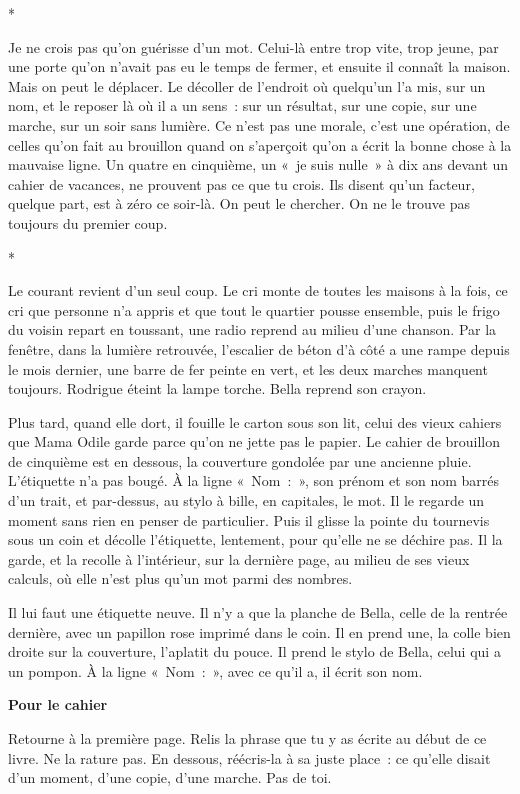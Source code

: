 \documentclass[10.5pt,twoside,openright]{book}
\newcommand{\asterisme}{\par\vspace{0.7em}\centerline{\color{gris}*\quad*\quad*}\vspace{0.7em}\par\noindent}
\newenvironment{pourcahier}[1]{\par\vspace{0.9em}\begin{tcolorbox}[colback=black!4,colframe=accent,boxrule=0pt,leftrule=2.2pt,arc=0pt,left=8pt,right=8pt,top=5pt,bottom=5pt]\small\textbf{#1}\par\smallskip}{\end{tcolorbox}\par}
\begin{document}
\asterisme

Je ne crois pas qu’on guérisse d’un mot. Celui-là entre trop vite, trop jeune, par une porte qu’on n’avait pas eu le temps de fermer, et ensuite il connaît la maison. Mais on peut le déplacer. Le décoller de l’endroit où quelqu’un l’a mis, sur un nom, et le reposer là où il a un sens : sur un résultat, sur une copie, sur une marche, sur un soir sans lumière. Ce n’est pas une morale, c’est une opération, de celles qu’on fait au brouillon quand on s’aperçoit qu’on a écrit la bonne chose à la mauvaise ligne. Un quatre en cinquième, un « je suis nulle » à dix ans devant un cahier de vacances, ne prouvent pas ce que tu crois. Ils disent qu’un facteur, quelque part, est à zéro ce soir-là. On peut le chercher. On ne le trouve pas toujours du premier coup.

\asterisme

Le courant revient d’un seul coup. Le cri monte de toutes les maisons à la fois, ce cri que personne n’a appris et que tout le quartier pousse ensemble, puis le frigo du voisin repart en toussant, une radio reprend au milieu d’une chanson. Par la fenêtre, dans la lumière retrouvée, l’escalier de béton d’à côté a une rampe depuis le mois dernier, une barre de fer peinte en vert, et les deux marches manquent toujours. Rodrigue éteint la lampe torche. Bella reprend son crayon.

Plus tard, quand elle dort, il fouille le carton sous son lit, celui des vieux cahiers que Mama Odile garde parce qu’on ne jette pas le papier. Le cahier de brouillon de cinquième est en dessous, la couverture gondolée par une ancienne pluie. L’étiquette n’a pas bougé. À la ligne « Nom : », son prénom et son nom barrés d’un trait, et par-dessus, au stylo à bille, en capitales, le mot. Il le regarde un moment sans rien en penser de particulier. Puis il glisse la pointe du tournevis sous un coin et décolle l’étiquette, lentement, pour qu’elle ne se déchire pas. Il la garde, et la recolle à l’intérieur, sur la dernière page, au milieu de ses vieux calculs, où elle n’est plus qu’un mot parmi des nombres.

Il lui faut une étiquette neuve. Il n’y a que la planche de Bella, celle de la rentrée dernière, avec un papillon rose imprimé dans le coin. Il en prend une, la colle bien droite sur la couverture, l’aplatit du pouce. Il prend le stylo de Bella, celui qui a un pompon. À la ligne « Nom : », avec ce qu’il a, il écrit son nom.

\begin{pourcahier}{Pour le cahier}
Retourne à la première page. Relis la phrase que tu y as écrite au début de ce livre. Ne la rature pas. En dessous, réécris-la à sa juste place : ce qu’elle disait d’un moment, d’une copie, d’une marche. Pas de toi.
\end{pourcahier}
\end{document}
